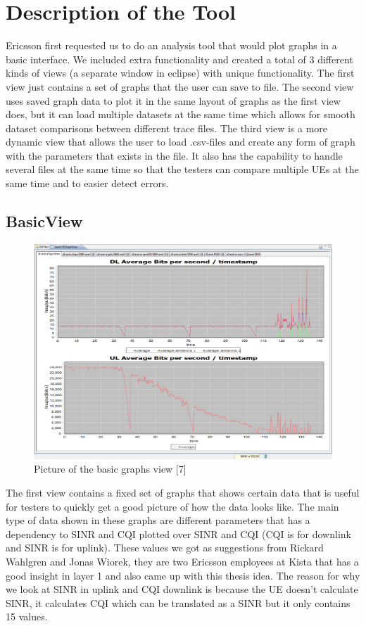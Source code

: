 \documentclass[cropmarks, frame, english]{idamasterthesis}
\begin{document}
\section{Description of the Tool}
Ericsson first requested us to do an analysis tool that would plot graphs in a basic interface. We included extra functionality and created a total of 3 different kinds of views (a separate window in eclipse) with unique functionality. The first view just contains a set of graphs that the user can save to file. The second view uses saved graph data to plot it in the same layout of graphs as the first view does, but it can load multiple datasets at the same time which allows for smooth dataset comparisons between different trace files. The third view is a more dynamic view that allows the user to load .csv-files and create any form of graph with the parameters that exists in the file. It also has the capability to handle several files at the same time so that the testers can compare multiple UEs at the same time and to easier detect errors.


\subsection{BasicView}

\begin{figure}[H]
\includegraphics[width=\textwidth]{BasicView}
\centering
\caption{Picture of the basic graphs view [7]}
\end{figure}

The first view contains a fixed set of graphs that shows certain data that is useful for testers to quickly get a good picture of how the data looks like. The main type of data shown in these graphs are different parameters that has a dependency to SINR and CQI plotted over SINR and CQI (CQI is for downlink and SINR is for uplink). These values we got as suggestions from Rickard Wahlgren and Jonas Wiorek, they are two Ericsson employees at Kista that has a good insight in layer 1 and also came up with this thesis idea. The reason for why we look at SINR in uplink and CQI downlink is because the UE doesn't calculate SINR, it calculates CQI which can be translated as a SINR but it only contains 15 values. \\
\end{document}
